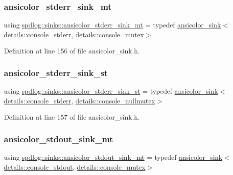 \subsubsection{\texorpdfstring{ansicolor\+\_\+stderr\+\_\+sink\+\_\+mt}{ansicolor\_stderr\_sink\_mt}}
{\footnotesize\ttfamily using \hyperlink{namespacespdlog_1_1sinks_aa12104ff6999c8908f687c3eb87d827e}{spdlog\+::sinks\+::ansicolor\+\_\+stderr\+\_\+sink\+\_\+mt} = typedef \hyperlink{classspdlog_1_1sinks_1_1ansicolor__sink}{ansicolor\+\_\+sink}$<$\hyperlink{structspdlog_1_1details_1_1console__stderr}{details\+::console\+\_\+stderr}, \hyperlink{structspdlog_1_1details_1_1console__mutex}{details\+::console\+\_\+mutex}$>$}



Definition at line 156 of file ansicolor\+\_\+sink.\+h.

\mbox{\label{namespacespdlog_1_1sinks_a3d8d6c5070124583420003b8c00ec441}} 
\subsubsection{\texorpdfstring{ansicolor\+\_\+stderr\+\_\+sink\+\_\+st}{ansicolor\_stderr\_sink\_st}}
{\footnotesize\ttfamily using \hyperlink{namespacespdlog_1_1sinks_a3d8d6c5070124583420003b8c00ec441}{spdlog\+::sinks\+::ansicolor\+\_\+stderr\+\_\+sink\+\_\+st} = typedef \hyperlink{classspdlog_1_1sinks_1_1ansicolor__sink}{ansicolor\+\_\+sink}$<$\hyperlink{structspdlog_1_1details_1_1console__stderr}{details\+::console\+\_\+stderr}, \hyperlink{structspdlog_1_1details_1_1console__nullmutex}{details\+::console\+\_\+nullmutex}$>$}



Definition at line 157 of file ansicolor\+\_\+sink.\+h.

\mbox{\label{namespacespdlog_1_1sinks_a10475192b7db414c386fbccb7401d852}} 
\subsubsection{\texorpdfstring{ansicolor\+\_\+stdout\+\_\+sink\+\_\+mt}{ansicolor\_stdout\_sink\_mt}}
{\footnotesize\ttfamily using \hyperlink{namespacespdlog_1_1sinks_a10475192b7db414c386fbccb7401d852}{spdlog\+::sinks\+::ansicolor\+\_\+stdout\+\_\+sink\+\_\+mt} = typedef \hyperlink{classspdlog_1_1sinks_1_1ansicolor__sink}{ansicolor\+\_\+sink}$<$\hyperlink{structspdlog_1_1details_1_1console__stdout}{details\+::console\+\_\+stdout}, \hyperlink{structspdlog_1_1details_1_1console__mutex}{details\+::console\+\_\+mutex}$>$}




